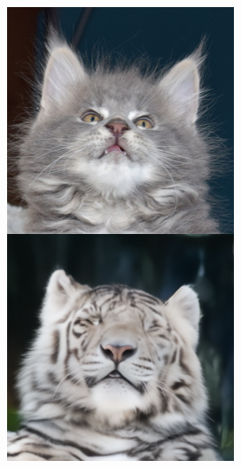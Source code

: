 \documentclass{article}
\begin{document}
\begin{figure}
\begin{minipage}[t]{0.48\textwidth}
\begin{minipage}[t]{0.19\textwidth}
            \includegraphics[width=\linewidth]{img/afhq_main/afhq256_fwd_4.png}
        \end{minipage}
        \begin{minipage}[t]{0.19\textwidth}

\end{minipage}
\end{minipage}
\end{figure}
\end{document}
